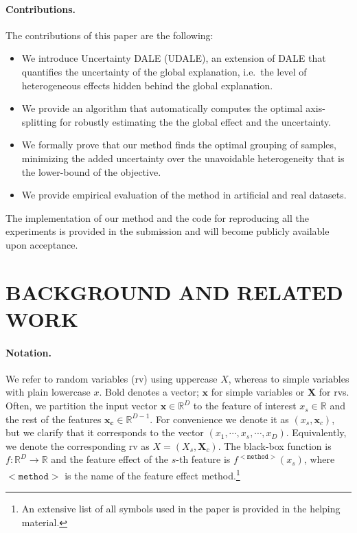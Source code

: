 \documentclass[twoside]{article}
\newcommand{\xc}{\mathbf{x_c}}
\newcommand{\xb}{\mathbf{x}}
\begin{document}
\paragraph{Contributions.} The contributions of this paper are the following:

\begin{itemize}
\item We introduce Uncertainty DALE (UDALE), an extension of DALE that
  quantifies the uncertainty of the global explanation, i.e.~the level
  of heterogeneous effects hidden behind the global explanation.
\item We provide an algorithm that automatically computes the optimal
  axis-splitting for robustly estimating the the global effect and the
  uncertainty.
\item We formally prove that our method finds the optimal grouping of
  samples, minimizing the added uncertainty over the unavoidable
  heterogeneity that is the lower-bound of the objective.
\item We provide empirical evaluation of the method in artificial and
  real datasets.
\end{itemize}

The implementation of our method and the code for reproducing all the
experiments is provided in the submission and will become publicly
available upon acceptance.


\section{BACKGROUND AND RELATED WORK}

\paragraph{Notation.}

We refer to random variables (rv) using uppercase \( X \), whereas to
simple variables with plain lowercase \( x \). Bold denotes a vector;
\( \xb \) for simple variables or \(\mathbf{X}\) for rvs. Often, we
partition the input vector \(\xb \in \mathbb{R}^D\) to the feature of
interest \(x_s \in \mathbb{R} \) and the rest of the features
\(\xc \in \mathbb{R}^{D-1}\). For convenience we denote it as
\((x_s, \mathbf{x}_c)\), but we clarify that it corresponds to the
vector \((x_1, \cdots , x_s, \cdots, x_D)\). Equivalently, we denote
the corresponding rv as \(X = (X_s, \mathbf{X}_c)\). The black-box
function is \(f : \mathbb{R}^D \rightarrow \mathbb{R}\) and the
feature effect of the \(s\)-th feature is
\(f^{\mathtt{<method>}}(x_s)\), where \(\mathtt{<method>}\) is the
name of the feature effect method.\footnote{An extensive list of all
  symbols used in the paper is provided in the helping material.}
\end{document}
